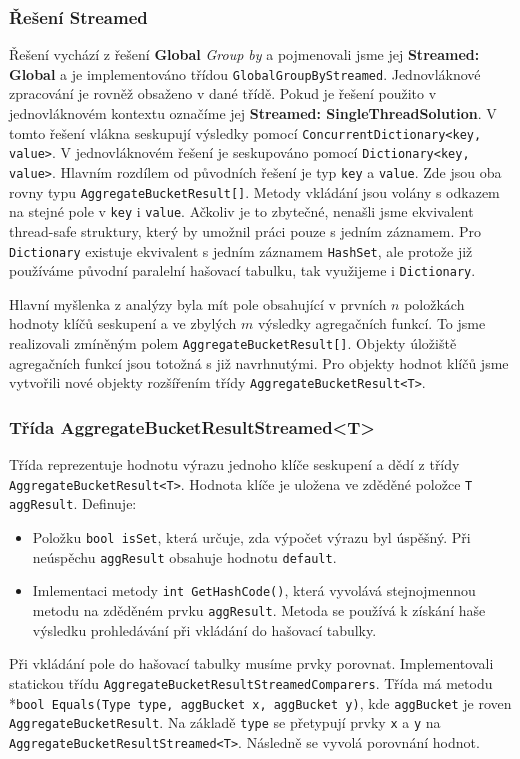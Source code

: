 \subsubsection{Řešení Streamed} \label{impl.improvement.groupby.streamed}

Řešení vychází z řešení \textbf{Global} \textit{Group by} a pojmenovali jsme jej \textbf{Streamed: Global} a je implementováno třídou \texttt{GlobalGroupByStreamed}.
Jednovláknové zpracování je rovněž obsaženo v dané třídě.
Pokud je řešení použito v jednovláknovém kontextu označíme jej \textbf{Streamed: SingleThreadSolution}.
V tomto řešení vlákna seskupují výsledky pomocí \texttt{ConcurrentDictionary<key, value>}.
V jednovláknovém řešení je seskupováno pomocí \texttt{Dictionary<key, value>}.
Hlavním rozdílem od původních řešení je typ \texttt{key} a \texttt{value}.
Zde jsou oba rovny typu \texttt{AggregateBucketResult[]}.
Metody vkládání jsou volány s odkazem na stejné pole v \texttt{key} i \texttt{value}.
Ačkoliv je to zbytečné, nenašli jsme ekvivalent thread-safe struktury, který by umožnil práci pouze s jedním záznamem.
Pro \texttt{Dictionary} existuje ekvivalent s jedním záznamem \texttt{HashSet}, ale protože již používáme původní paralelní hašovací tabulku, tak využijeme i \texttt{Dictionary}. 

Hlavní myšlenka z analýzy byla mít pole obsahující v prvních $n$ položkách hodnoty klíčů seskupení a ve zbylých $m$ výsledky agregačních funkcí.
To jsme realizovali zmíněným polem \texttt{AggregateBucketResult[]}.
Objekty úložiště agregačních funkcí jsou totožná s již navrhnutými.
Pro objekty hodnot klíčů jsme vytvořili nové objekty rozšířením třídy \texttt{AggregateBucketResult<T>}.

\subsubsection{Třída AggregateBucketResultStreamed<T>}

Třída reprezentuje hodnotu výrazu jednoho klíče seskupení a dědí z třídy \texttt{AggregateBucketResult<T>}.
Hodnota klíče je uložena ve zděděné položce \texttt{T aggResult}.
Definuje:
\begin{itemize}
\item Položku \texttt{bool isSet}, která určuje, zda výpočet výrazu byl úspěšný.
Při neúspěchu \texttt{aggResult} obsahuje hodnotu \texttt{default}. 
\item Imlementaci metody \texttt{int GetHashCode()}, která vyvolává stejnojmennou metodu na zděděném prvku \texttt{aggResult}.
Metoda se používá k získání haše výsledku prohledávání při vkládání do hašovací tabulky.
\end{itemize}
Při vkládání pole do hašovací tabulky musíme prvky porovnat. 
Implementovali statickou třídu \texttt{AggregateBucketResultStreamedComparers}.
Třída má metodu \\*\texttt{bool Equals(Type type, aggBucket x, aggBucket y)}, kde \texttt{aggBucket} je roven \texttt{AggregateBucketResult}.
Na základě \texttt{type} se přetypují prvky \texttt{x} a \texttt{y} na \texttt{AggregateBucketResultStreamed<T>}.
Následně se vyvolá porovnání hodnot.


